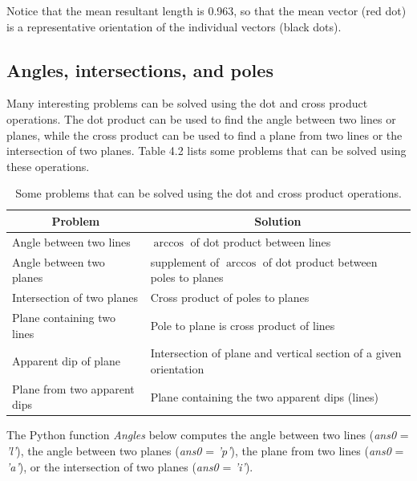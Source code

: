 \documentclass[a4paper , 12pt]{book}
\begin{document}
Notice that the mean resultant length is 0.963, so that the mean vector (red dot) is a representative orientation of the individual vectors (black dots).

\subsection{Angles, intersections, and poles}

Many interesting problems can be solved using the dot and cross product operations. The dot product can be used to find the angle between two lines or planes, while the cross product can be used to find a plane from two lines or the intersection of two planes. Table 4.2 lists some problems that can be solved using these operations.

\begin{table}[h!]
\small
\centering
\begin{tabular}{ | p{6cm} | p{6cm} | } 
 \hline
 \multicolumn{1}{|c|}{Problem} & \multicolumn{1}{|c|}{Solution}  \\
 \hline
 Angle between two lines & $\arccos$ of dot product between lines \\
 \hline
 Angle between two planes & supplement of $\arccos$ of dot product between poles to planes \\
 \hline
 Intersection of two planes & Cross product of poles to planes \\
 \hline
 Plane containing two lines & Pole to plane is cross product of lines \\
 \hline
 Apparent dip of plane & Intersection of plane and vertical section of a given orientation \\
 \hline
 Plane from two apparent dips & Plane containing the two apparent dips (lines) \\
 \hline
\end{tabular}
\caption{Some problems that can be solved using the dot and cross product operations.}
\label{table4.2}
\end{table}

The Python function \textit{Angles} below computes the angle between two lines (\textit{ans0} = \textit{'l'}), the angle between two planes (\textit{ans0} = \textit{'p'}), the plane from two lines (\textit{ans0} = \textit{'a'}), or the intersection of two planes (\textit{ans0} = \textit{'i'}).
\end{document}
